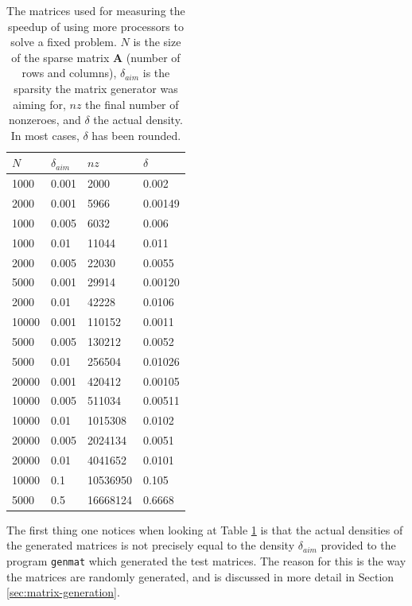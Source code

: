 \documentclass[a4paper]{article}
\newcommand{\mat}[1]{\ensuremath{\boldsymbol{#1}}}
\begin{document}
\begin{table}
    \centering
    \begin{tabular}{l|l|l|l}
        $N$ & $\delta_{aim}$ & $nz$ & $\delta$ \\ \hline
1000  &  0.001   &   2000   &   0.002\\
2000  &  0.001   &   5966   &   0.00149\\
1000  &  0.005   &   6032   &   0.006\\
1000  &  0.01   &   11044   &   0.011\\
2000  &  0.005  &   22030   &   0.0055\\
5000  &  0.001   &   29914   &   0.00120\\
2000  &  0.01   &   42228   &   0.0106\\
10000  & 0.001    &   110152   &   0.0011\\
5000  &  0.005   &   130212   &   0.0052\\
5000  &  0.01  &   256504   &   0.01026\\
20000  & 0.001    &   420412   &   0.00105\\
10000  & 0.005   &   511034   &   0.00511\\
10000  & 0.01   &   1015308   &   0.0102\\
20000  & 0.005    &   2024134   &   0.0051\\
20000  & 0.01    &   4041652   &   0.0101\\
10000  & 0.1    &   10536950   &   0.105\\
5000  &  0.5   &   16668124   &   0.6668\\
    \end{tabular}
    \caption{The matrices used for measuring the speedup of using more processors to solve a fixed problem. $N$ is the size of the sparse matrix \mat A (number of rows and columns), $\delta_{aim}$ is the sparsity the matrix generator was aiming for, $nz$ the final number of nonzeroes, and $\delta$ the actual density. In most cases, $\delta$ has been rounded.}
    \label{tab:time-run}
\end{table}

The first thing one notices when looking at Table \ref{tab:time-run} is that the actual densities of
the generated matrices is not precisely equal to the density $\delta_{aim}$ provided to the program
\texttt{genmat} which generated the test matrices. The reason for this is the way the matrices are
randomly generated, and is discussed in more detail in Section \ref{sec:matrix-generation}.
\end{document}
